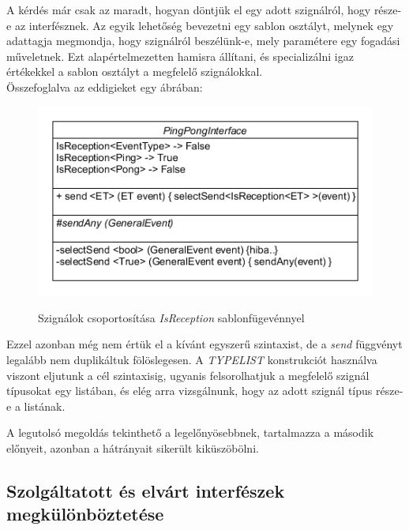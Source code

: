 \documentclass[a4paper,12pt]{report}
\begin{document}
\begin{enumerate}
A kérdés már csak az maradt, hogyan döntjük el egy adott szignálról, hogy része-e az interfésznek. Az egyik lehetőség bevezetni egy sablon osztályt, melynek egy adattagja megmondja, hogy szignálról beszélünk-e, mely paramétere egy fogadási műveletnek. Ezt alapértelmezetten hamisra állítani, és specializálni igaz értékekkel a sablon osztályt a megfelelő szignálokkal. \\
Összefoglalva az eddigieket egy ábrában:
\begin{figure}[H]
\begin{center}
\includegraphics[scale=0.6]{better_inf.png} \\
\end{center}
\caption{Szignálok csoportosítása \textit{IsReception} sablonfügevénnyel}
\end{figure}

Ezzel azonban még nem értük el a kívánt egyszerű szintaxist, de a \textit{send} függvényt legalább nem duplikáltuk fölöslegesen. A \textit{TYPELIST} \cite{typelist} konstrukciót használva viszont eljutunk a cél szintaxisig, ugyanis felsorolhatjuk a megfelelő szignál típusokat egy listában, és elég arra vizsgálnunk, hogy az adott szignál típus része-e a listának.
\end{enumerate}

A legutolsó megoldás tekinthető a legelőnyösebbnek, tartalmazza a második előnyeit, azonban a hátrányait sikerült kiküszöbölni.

\subsection{Szolgáltatott és elvárt interfészek megkülönböztetése}
\end{document}
